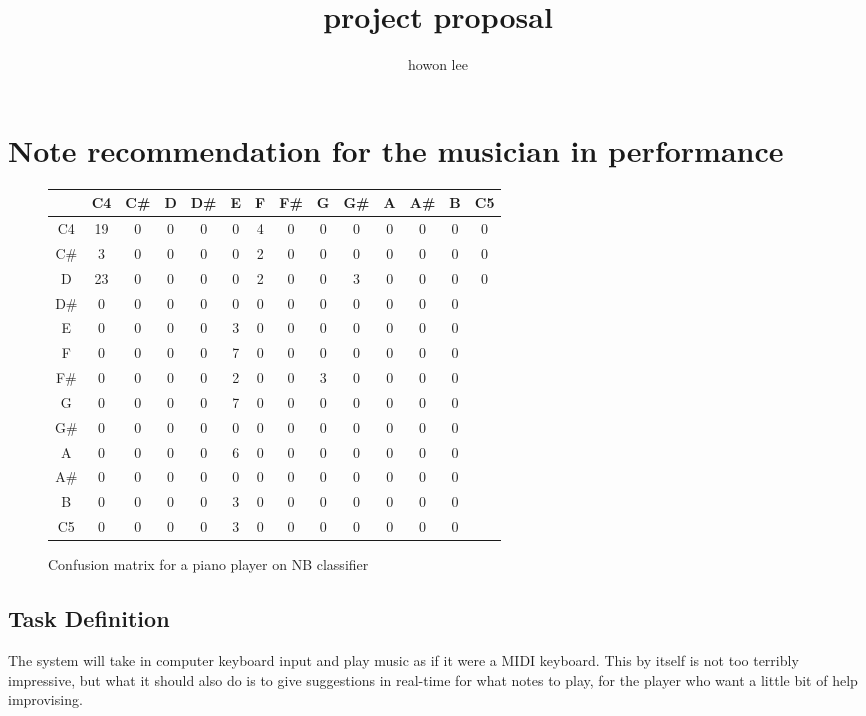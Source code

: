 \documentclass{article}
\begin{document}
\title{project proposal}
\author{howon lee}
\maketitle
\section*{Note recommendation for the musician in performance}

\begin{figure}
\begin{tabular}{c | c c c c c c c c c c c c c}
 & C4 & C\# & D & D\# & E & F & F\# & G & G\# & A & A\# & B & C5\\
\hline
C4 & 19 & 0 & 0 & 0 & 0 & 4 & 0 & 0 & 0 & 0 & 0 & 0 & 0 \\
C\# & 3  & 0 & 0 & 0 & 0 & 2 & 0 & 0 & 0 & 0 & 0 & 0 & 0\\
D & 23 & 0 & 0 & 0 & 0 & 2 & 0 & 0 & 3 & 0 & 0 & 0 & 0\\
D\# & 0 & 0 & 0 & 0 & 0 & 0 & 0 & 0 & 0 & 0 & 0 & 0\\
E & 0 & 0 & 0 & 0 & 3 & 0 & 0 & 0 & 0 & 0 & 0 & 0\\
F & 0 & 0 & 0 & 0 & 7 & 0 & 0 & 0 & 0 & 0 & 0 & 0\\
F#  & 0 & 0 & 0 & 0 & 2 & 0 & 0 & 3 & 0 & 0 & 0 & 0\\
G & 0 & 0 & 0 & 0 & 7 & 0 & 0 & 0 & 0 & 0 & 0 & 0\\
G\#  & 0 & 0 & 0 & 0 & 0 & 0 & 0 & 0 & 0 & 0 & 0 & 0\\
A & 0 & 0 & 0 & 0 & 6 & 0 & 0 & 0 & 0 & 0 & 0 & 0\\
A\#  & 0 & 0 & 0 & 0 & 0 & 0 & 0 & 0 & 0 & 0 & 0 & 0\\
B & 0 & 0 & 0 & 0 & 3 & 0 & 0 & 0 & 0 & 0 & 0 & 0\\
C5 & 0 & 0 & 0 & 0 & 3 & 0 & 0 & 0 & 0 & 0 & 0 & 0\\
\end{tabular}
\caption{Confusion matrix for a piano player on NB classifier}
\end{figure}

\subsection*{Task Definition}
The system will take in computer keyboard input and play music as if it were a MIDI keyboard. This by itself is not too terribly impressive, but what it should also do is to give suggestions in real-time for what notes to play, for the player who want a little bit of help improvising.
\end{document}
